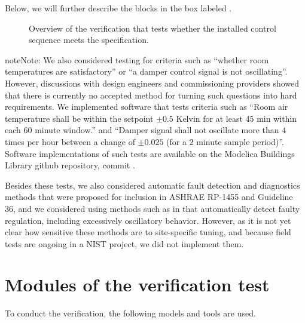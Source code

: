 \documentclass[letterpaper,10pt, openany,english]{sphinxmanual}
\let\sphinxpxdimen\pdfpxdimen\else\newdimen\sphinxpxdimen
\begin{document}
Below, we will further describe the blocks in the box labeled .

\begin{figure}[htbp]
\centering
\capstart

\noindent\sphinxincludegraphics[width=700\sphinxpxdimen]{{overviewBlockDiagram}.pdf}
\caption{Overview of the verification that tests whether the installed
control sequence meets the specification.}\label{\detokenize{verification:id2}}\label{\detokenize{verification:fig-con-seq-ver}}\end{figure}

\begin{sphinxadmonition}{note}{Note:}
We also considered testing for criteria such as “whether room temperatures
are satisfactory” or “a damper control signal is not oscillating”. However,
discussions with design engineers and commissioning providers showed that
there is currently no accepted method for turning such questions into
hard requirements. We implemented software that tests
criteria such as
“Room air temperature shall be within the setpoint \(\pm 0.5\) Kelvin
for at least 45 min within each \(60\) minute window.” and
“Damper signal shall not oscillate more than \(4\) times per hour
between a change of \(\pm 0.025\) (for a \(2\) minute sample period)”.
Software implementations of such tests are available on
the Modelica Buildings Library github repository, commit
.

Besides these tests, we also considered automatic fault detection and diagnostics methods
that were proposed for inclusion in ASHRAE RP-1455 and Guideline 36,
and we considered using methods such as in 
that automatically detect
faulty regulation, including excessively oscillatory behavior.
However, as it is not yet clear how sensitive these methods
are to site-specific tuning, and because field tests are ongoing in a NIST project,
we did not implement them.
\end{sphinxadmonition}


\section{Modules of the verification test}
\label{\detokenize{verification:modules-of-the-verification-test}}
To conduct the verification, the following models and
tools are used.
\end{document}
